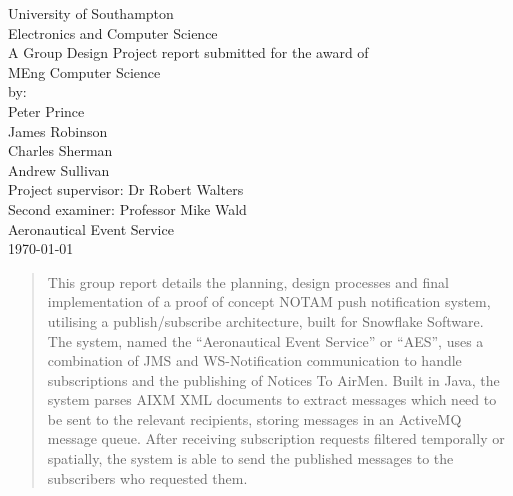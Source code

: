 \documentclass[a4paper, 12pt, twoside]{article}
\begin{document}
\begin{titlepage}

	\center

	{\large University of Southampton}\\[0.2cm]
	{\large Electronics and Computer Science}\\[3cm]

  {\large A Group Design Project report submitted for the award of}\\[0.2cm]
  {\Large MEng Computer Science}\\[3cm]

  {\large by:}\\[0.2cm]
	{\Large Peter Prince}\\[0.2cm]
	{\Large James Robinson}\\[0.2cm]
	{\Large Charles Sherman}\\[0.2cm]
	{\Large Andrew Sullivan}\\[3cm]

  {\large Project supervisor: Dr Robert Walters}\\[0.2cm]
  {\large Second examiner: Professor Mike Wald}\\[3cm]

  {\LARGE Aeronautical Event Service}\\[3cm]
	{\Large \today}\\[3cm]

\end{titlepage}

\begin{abstract}

This group report details the planning, design processes and final implementation of a proof of concept NOTAM push notification system, utilising a publish/subscribe architecture, built for Snowflake Software. The system, named the ``Aeronautical Event Service'' or ``AES'', uses a combination of JMS and WS-Notification communication to handle subscriptions and the publishing of Notices To AirMen. Built in Java, the system parses AIXM XML documents to extract messages which need to be sent to the relevant recipients, storing messages in an ActiveMQ message queue. After receiving subscription requests filtered temporally or spatially, the system is able to send the published messages to the subscribers who requested them.

\end{abstract}

\newpage
\end{document}
